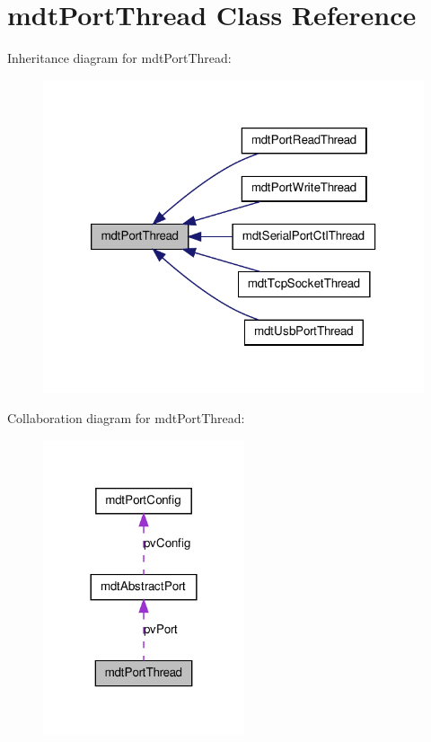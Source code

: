 \hypertarget{classmdt_port_thread}{
\section{mdtPortThread Class Reference}
\label{classmdt_port_thread}
}


Inheritance diagram for mdtPortThread:\nopagebreak
\begin{figure}[H]
\begin{center}
\leavevmode
\includegraphics[width=318pt]{classmdt_port_thread__inherit__graph}
\end{center}
\end{figure}


Collaboration diagram for mdtPortThread:\nopagebreak
\begin{figure}[H]
\begin{center}
\leavevmode
\includegraphics[width=168pt]{classmdt_port_thread__coll__graph}
\end{center}
\end{figure}
